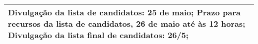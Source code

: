 \begin{longtable}{|p{17.5cm}|}
 \\ \hline 
Divulgação da lista de candidatos: 25 de maio; Prazo para recursos da lista de candidatos, 26 de maio até às 12 horas; Divulgação da lista final de candidatos: 26/5;

 \\ \hline 

\end{longtable} 




